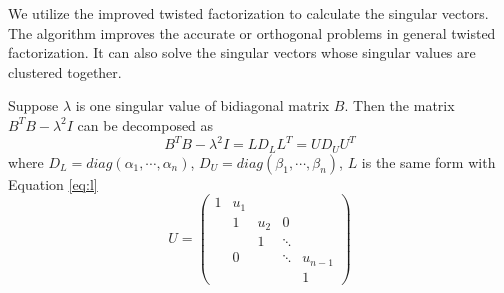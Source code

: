 We utilize the improved twisted factorization to calculate the singular vectors.
The algorithm improves the accurate or orthogonal problems in general twisted factorization.
It can also solve the singular vectors whose singular values are clustered together.

Suppose $\lambda$ is one singular value of bidiagonal matrix $B$.
Then the matrix $B^T B - \lambda^2 I$ can be decomposed as
\begin{equation}
B^T B - \lambda^2 I = L D_L L^T = U D_U U^T
\end{equation}
where $D_L=diag(\alpha_1, \cdots, \alpha_n)$, $D_U = diag(\beta_1, \cdots, \beta_n)$, $L$ is the same form with Equation \ref{eq:l}
\begin{equation}
 U =  \left( \begin{array}{ccccc}
  1 & u_{1}&       &       &  \\
    & 1    & u_{2} & 0     &  \\
    &      & 1     & \ddots&  \\
    & 0    &       & \ddots& u_{n-1} \\
    &      &       &       & 1
 \end{array} \right)
\end{equation}

